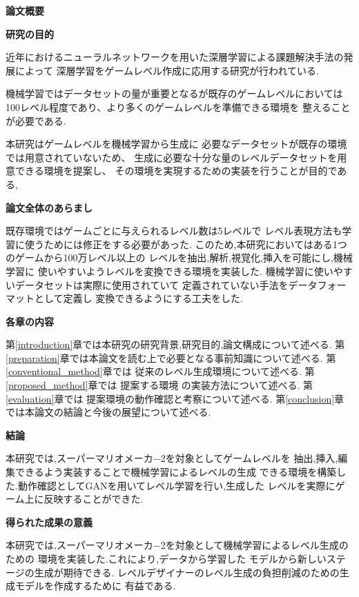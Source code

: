 {\huge \textbf{論文概要}  \newline}

 {\Large \bf 研究の目的 \newline}

近年におけるニューラルネットワークを用いた深層学習による課題解決手法の発展によって
深層学習をゲームレベル作成に応用する研究が行われている.

機械学習ではデータセットの量が重要となるが既存のゲームレベルにおいては
100レベル程度であり、より多くのゲームレベルを準備できる環境を
整えることが必要である.

本研究はゲームレベルを機械学習から生成に
必要なデータセットが既存の環境では用意されていないため、
生成に必要な十分な量のレベルデータセットを用意できる環境を提案し、
その環境を実現するための実装を行うことが目的である,

\vspace{1cm}

{\Large \bf 論文全体のあらまし \newline}

既存環境ではゲームごとに与えられるレベル数は5レベルで
レベル表現方法も学習に使うためには修正をする必要があった.
このため,本研究においてはある1つのゲームから100万レベル以上の
レベルを抽出,解析,視覚化,挿入を可能にし,機械学習に
使いやすいようレベルを変換できる環境を実装した.
機械学習に使いやすいデータセットは実際に使用されていて
定義されていない手法をデータフォーマットとして定義し
変換できるようにする工夫をした.

\vspace{1cm}

{\Large \bf 各章の内容 \newline}

第\ref{introduction}章では本研究の研究背景,研究目的,論文構成について述べる.
第\ref{preparation}章では本論文を読む上で必要となる事前知識について述べる.
第\ref{conventional_method}章では 従来のレベル生成環境について述べる.
第\ref{proposed_method}章では 提案する環境 の実装方法について述べる.
第\ref{evaluation}章では 提案環境の動作確認と考察について述べる.
第\ref{conclusion}章では本論文の結論と今後の展望について述べる.

\vspace{1cm}

{\Large \bf 結論 \newline}

本研究では,スーパーマリオメーカ−2を対象としてゲームレベルを
抽出,挿入,編集できるよう実装することで機械学習によるレベルの生成
できる環境を構築した.動作確認としてGANを用いてレベル学習を行い,生成した
レベルを実際にゲーム上に反映することができた.

\vspace{1cm}
{\Large \bf 得られた成果の意義 \newline}

本研究では,スーパーマリオメーカ−2を対象として機械学習によるレベル生成のための
環境を実装した.これにより,データから学習した
モデルから新しいステージの生成が期待できる.
レベルデザイナーのレベル生成の負担削減のための生成モデルを作成するために
有益である.


